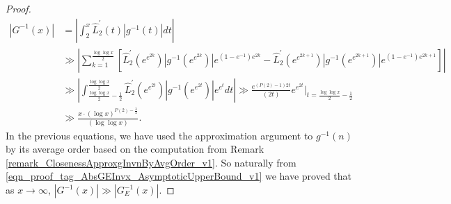 \documentclass[11pt,reqno,a4letter]{article}
\numberwithin{figure}{section}
\numberwithin{table}{section}
\theoremstyle{plain}
\numberwithin{theorem}{section}
\theoremstyle{definition}
\begin{document}
\begin{proof}
\begin{align*} 
|G^{-1}(x)| & = \left\lvert \int_2^x \widehat{L}_2^{\prime}(t) |g^{-1}(t)| dt \right\rvert \\ 
     & \gg \left\lvert \sum_{k=1}^{\frac{\log\log x}{2}} \left[ 
     \widehat{L}_2^{\prime}\left(e^{e^{2k}}\right) \left\lvert g^{-1}\left(e^{e^{2k}}\right) \right\rvert 
     e^{(1-e^{-1})e^{2k}} - 
     \widehat{L}_2^{\prime}\left(e^{e^{2k+1}}\right) \left\lvert g^{-1}\left(e^{e^{2k+1}}\right) \right\rvert 
     e^{(1-e^{-1})e^{2k+1}}\right] \right\rvert \\ 
     & \gg \left\lvert \int_{\frac{\log\log x}{2} - \frac{1}{2}}^{\frac{\log\log x}{2}} 
     \widehat{L}_2^{\prime}\left(e^{e^{2t}}\right) \left\lvert g^{-1}\left(e^{e^{2t}}\right) \right\rvert 
     e^{e^{t}} dt \right\rvert 
     \gg \frac{e^{(P(2) - 1)2t}}{(2t)} e^{e^{2t}} \Biggr\rvert_{t=\frac{\log\log x}{2} - \frac{1}{2}} \\ 
     & \gg \frac{x \cdot (\log x)^{P(2) - \frac{3}{2}}}{(\log\log x)}. 
\end{align*} 
In the previous equations, we have used the approximation argument to $g^{-1}(n)$ by its average order 
based on the computation from Remark \ref{remark_ClosenessApproxgInvnByAvgOrder_v1}. 
So naturally from \eqref{eqn_proof_tag_AbsGEInvx_AsymptoticUpperBound_v1} we 
have proved that as $x \rightarrow \infty$, 
$|G^{-1}(x)| \gg |G_E^{-1}(x)|$. 
\end{proof} 
\end{document}
